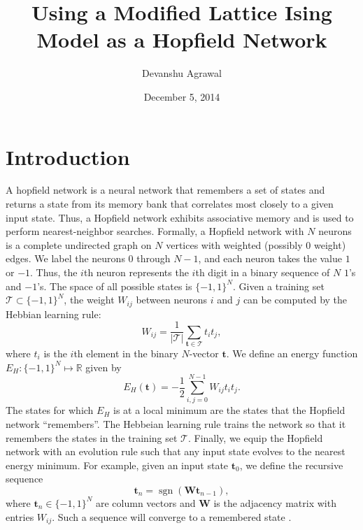 \documentclass[12pt]{article}
\title{Using a Modified Lattice Ising Model as a Hopfield Network}
\author{Devanshu Agrawal}
\date{December 5, 2014}
\newcommand{\calT}{\mathcal{T}}
\newcommand{\sgn}{\operatorname{sgn}}
\begin{document}
\maketitle

\section{Introduction}

A hopfield network is a neural network that remembers a set of states and returns a state from its memory bank that correlates most closely to a given input state. Thus, a Hopfield network exhibits associative memory and is used to perform nearest-neighbor searches. Formally, a Hopfield network with $N$ neurons is a complete undirected graph on $N$ vertices with weighted (possibly $0$ weight) edges. We label the neurons $0$ through $N-1$, and each neuron takes the value $1$ or $-1$. Thus, the $i$th neuron represents the $i$th digit in a binary sequence of $N$ $1$'s and $-1$'s. The space of all possible states is $\{-1, 1\}^N$. Given a training set $\calT\subset \{-1, 1\}^N$, the weight $W_{ij}$ between neurons $i$ and $j$ can be computed by the Hebbian learning rule:
\begin{equation} \label{hebbian}
W_{ij} = \frac{1}{|\calT|} \sum_{\mathbf{t}\in\calT} t_i t_j,
\end{equation}
where $t_i$ is the $i$th element in the binary $N$-vector $\mathbf{t}$. We define an energy function $E_H:\{-1,1\}^N\mapsto \mathbb{R}$ given by
\begin{equation} \label{hopfieldE}
E_H(\mathbf{t}) = -\frac{1}{2}\sum_{i,j=0}^{N-1} W_{ij} t_i t_j.
\end{equation}
The states for which $E_H$ is at a local minimum are the states that the Hopfield network ``remembers''. The Hebbeian learning rule trains the network so that it remembers the states in the training set $\calT$. Finally, we equip the Hopfield network with an evolution rule such that any input state evolves to the nearest energy minimum. For example, given an input state $\mathbf{t}_0$, we define the recursive sequence
\begin{equation} \label{evolution}
\mathbf{t}_n = \sgn(\mathbf{W}\mathbf{t}_{n-1}),
\end{equation}
where $\mathbf{t}_n\in\{-1, 1\}^N$ are column vectors and $\mathbf{W}$ is the adjacency matrix with entries $W_{ij}$. Such a sequence will converge to a remembered state \cite{rojas}.
\end{document}
